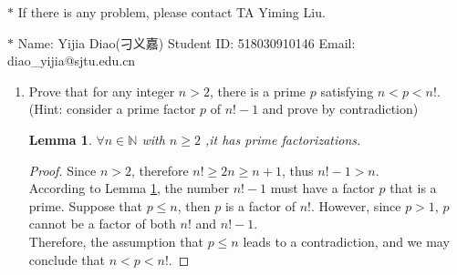 \documentclass[12pt,a4paper,UTF8]{article}
\newtheorem{lemma}[theorem]{Lemma}%
\theoremstyle{definition}
\begin{document}
\noindent

\noindent{}
\begin{center}
\footnotesize{\color{red}$*$ If there is any problem, please contact TA Yiming Liu.}

\footnotesize{\color{blue}$*$ Name: Yijia Diao(刁义嘉)  \quad Student ID: 518030910146 \quad Email: diao\_yijia@sjtu.edu.cn}
\end{center}

\begin{enumerate}
    \item
    Prove that for any integer $n>2$, there is a prime $p$ satisfying $n<p<n!$. {\color{blue}(Hint: consider a prime factor $p$ of $n!-1$ and prove by contradiction)}
    \begin{lemma} \label{lemma1}
    	$ {\forall} n \in \mathbb{N} $ with  $ n \geq 2 $ ,it has prime factorizations.
    \end{lemma}
    \begin{proof}
    	Since $ n > 2 $, therefore $ n! \geq 2n \geq n + 1 $, thus $ n! - 1 > n $.\\
    	According to Lemma \ref{lemma1}, the number $ n! - 1 $ must have a factor $ p $ that is a prime. Suppose that $ p \leq n $, then $ p $ is a factor of $ n! $. However, since $ p > 1 $, $ p $ cannot be a factor of both $ n! $ and $ n! - 1 $.\\
    	Therefore, the assumption that $ p \leq n $ leads to a contradiction, and we may conclude that $n<p<n!$.
    \end{proof}


\end{enumerate}
\end{document}
